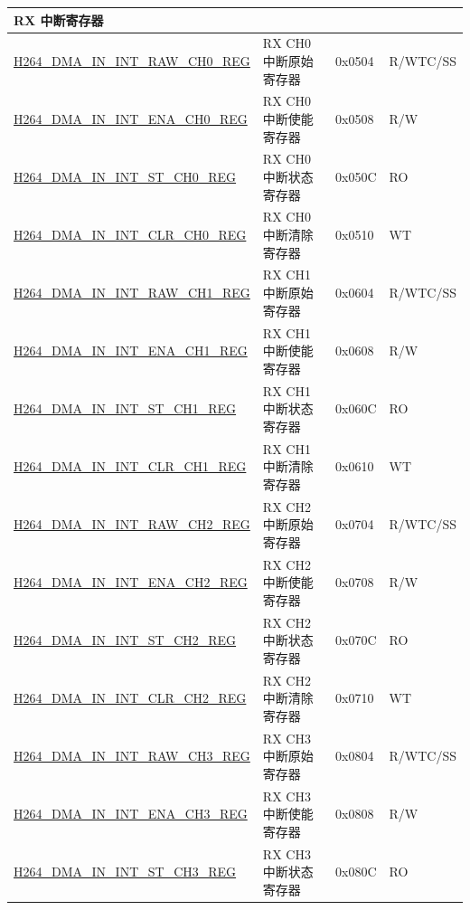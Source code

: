 \begin{longtable}{ | p{7.5cm} | p{5.7cm} | p{1.2cm} | p{1.5cm} | }
\multicolumn{4}{|l|}{\textbf{RX 中断寄存器}} \\ \hline
    \hyperref[regdesc:H264DMAININTRAWCH0REG]{H264\_DMA\_IN\_INT\_RAW\_CH0\_REG} & RX CH0 中断原始寄存器 & 0x0504 & R/WTC/SS \\ \hline
    \hyperref[regdesc:H264DMAININTENACH0REG]{H264\_DMA\_IN\_INT\_ENA\_CH0\_REG} & RX CH0 中断使能寄存器 & 0x0508 & R/W \\ \hline
    \hyperref[regdesc:H264DMAININTSTCH0REG]{H264\_DMA\_IN\_INT\_ST\_CH0\_REG} & RX CH0 中断状态寄存器 & 0x050C & RO \\ \hline
    \hyperref[regdesc:H264DMAININTCLRCH0REG]{H264\_DMA\_IN\_INT\_CLR\_CH0\_REG} & RX CH0 中断清除寄存器 & 0x0510 & WT \\ \hline
    \hyperref[regdesc:H264DMAININTRAWCH1REG]{H264\_DMA\_IN\_INT\_RAW\_CH1\_REG} & RX CH1 中断原始寄存器 & 0x0604 & R/WTC/SS \\ \hline
    \hyperref[regdesc:H264DMAININTENACH1REG]{H264\_DMA\_IN\_INT\_ENA\_CH1\_REG} & RX CH1 中断使能寄存器 & 0x0608 & R/W \\ \hline
    \hyperref[regdesc:H264DMAININTSTCH1REG]{H264\_DMA\_IN\_INT\_ST\_CH1\_REG} & RX CH1 中断状态寄存器 & 0x060C & RO \\ \hline
    \hyperref[regdesc:H264DMAININTCLRCH1REG]{H264\_DMA\_IN\_INT\_CLR\_CH1\_REG} & RX CH1 中断清除寄存器 & 0x0610 & WT \\ \hline
    \hyperref[regdesc:H264DMAININTRAWCH2REG]{H264\_DMA\_IN\_INT\_RAW\_CH2\_REG} & RX CH2 中断原始寄存器 & 0x0704 & R/WTC/SS \\ \hline
    \hyperref[regdesc:H264DMAININTENACH2REG]{H264\_DMA\_IN\_INT\_ENA\_CH2\_REG} & RX CH2 中断使能寄存器 & 0x0708 & R/W \\ \hline
    \hyperref[regdesc:H264DMAININTSTCH2REG]{H264\_DMA\_IN\_INT\_ST\_CH2\_REG} & RX CH2 中断状态寄存器 & 0x070C & RO \\ \hline
    \hyperref[regdesc:H264DMAININTCLRCH2REG]{H264\_DMA\_IN\_INT\_CLR\_CH2\_REG} & RX CH2 中断清除寄存器 & 0x0710 & WT \\ \hline
    \hyperref[regdesc:H264DMAININTRAWCH3REG]{H264\_DMA\_IN\_INT\_RAW\_CH3\_REG} & RX CH3 中断原始寄存器 & 0x0804 & R/WTC/SS \\ \hline
    \hyperref[regdesc:H264DMAININTENACH3REG]{H264\_DMA\_IN\_INT\_ENA\_CH3\_REG} & RX CH3 中断使能寄存器 & 0x0808 & R/W \\ \hline
    \hyperref[regdesc:H264DMAININTSTCH3REG]{H264\_DMA\_IN\_INT\_ST\_CH3\_REG} & RX CH3 中断状态寄存器 & 0x080C & RO \\ \hline

\end{longtable}
